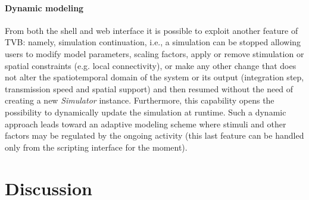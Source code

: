 \documentclass{bioinfo}
\newcommand*{\tvbclass}[1]{{\ttfamily\emph{#1}}}    %
\begin{document}
    \paragraph*{Dynamic modeling} From both the shell and web interface it is
    possible to exploit another feature of TVB: namely, simulation continuation,
    i.e., a simulation can be stopped allowing users to modify model parameters,
    scaling factors, apply or remove stimulation or spatial constraints (e.g. local
    connectivity), or make any other change that does not alter the spatiotemporal
    domain of the system or its output (integration step, transmission speed and
    spatial support) and then resumed without the need of creating a new
    \tvbclass{Simulator} instance. Furthermore, this capability opens the
    possibility to dynamically update the simulation at runtime. Such a dynamic
    approach leads toward an adaptive modeling scheme where stimuli and other
    factors may be regulated by the ongoing activity (this last feature can be handled
    only from the scripting interface for the moment).
     

    \section{Discussion} 
\end{document}
